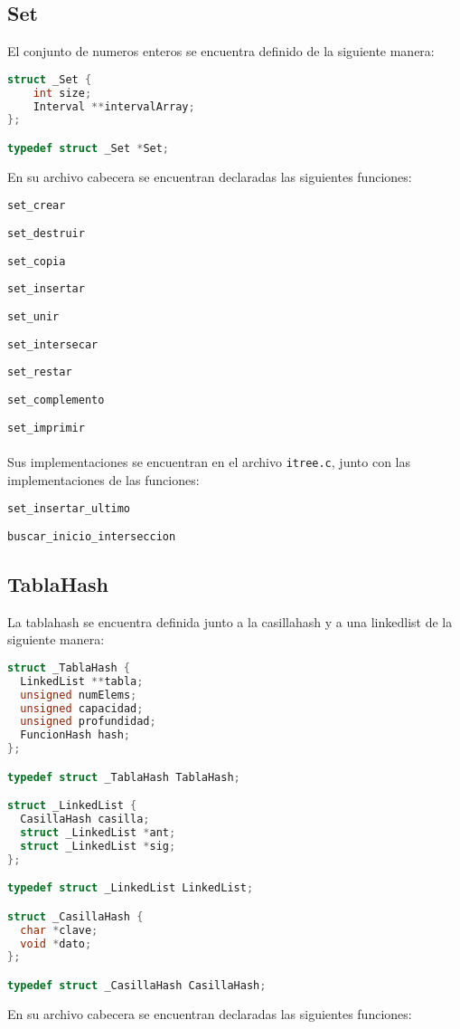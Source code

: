 \documentclass[]{article}
\begin{document}
\subsection{Set}
El conjunto de numeros enteros se encuentra definido de la siguiente manera:

\begin{lstlisting}[language=C]
struct _Set {
    int size;
    Interval **intervalArray;
};

typedef struct _Set *Set;

\end{lstlisting}
En su archivo cabecera se encuentran declaradas las siguientes funciones:

\verb|set_crear|

\verb|set_destruir|

\verb|set_copia|

\verb|set_insertar|

\verb|set_unir|

\verb|set_intersecar|

\verb|set_restar|

\verb|set_complemento|

\verb|set_imprimir|\\\\
Sus implementaciones se encuentran en el archivo \verb|itree.c|, junto con las implementaciones de las funciones:

\verb|set_insertar_ultimo|

\verb|buscar_inicio_interseccion|
\subsection{TablaHash}
La tablahash se encuentra definida junto a la casillahash y a una linkedlist de la siguiente manera:

\begin{lstlisting}[language=C]
struct _TablaHash {
  LinkedList **tabla;
  unsigned numElems;
  unsigned capacidad;
  unsigned profundidad;
  FuncionHash hash;
};

typedef struct _TablaHash TablaHash;

struct _LinkedList {
  CasillaHash casilla;
  struct _LinkedList *ant;
  struct _LinkedList *sig;
};

typedef struct _LinkedList LinkedList;

struct _CasillaHash {
  char *clave;
  void *dato;
};

typedef struct _CasillaHash CasillaHash;

\end{lstlisting}
En su archivo cabecera se encuentran declaradas las siguientes funciones:
\end{document}
